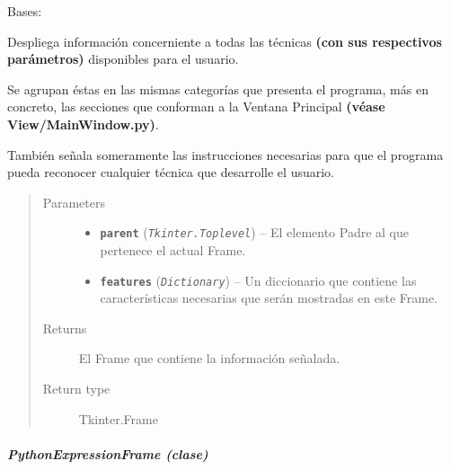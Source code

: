 \documentclass[letterpaper,10pt,english]{sphinxmanual}
\begin{document}
\begin{fulllineitems}
\label{View/Additional/MenuInternalOption/InternalOptionTab/CharacteristicFrame:View.Additional.MenuInternalOption.InternalOptionTab.CharacteristicFrame.CharacteristicFrame}
Bases: 

\begin{DUlineblock}{0em}
\item[] Despliega información concerniente a todas las técnicas 
\textbf{(con sus respectivos parámetros)} disponibles para el usuario.
\item[] Se agrupan éstas en las mismas categorías que presenta el programa,
más en concreto, las secciones que conforman a la Ventana Principal 
\textbf{(véase View/MainWindow.py)}.
\item[] 
\item[] También señala someramente las instrucciones necesarias para que el
programa pueda reconocer cualquier técnica que desarrolle el usuario.
\end{DUlineblock}
\begin{quote}\begin{description}
\item[{Parameters}] \leavevmode\begin{itemize}
\item {} 
\textbf{\texttt{parent}} (\emph{\texttt{Tkinter.Toplevel}}) -- El elemento Padre al que pertenece el actual
Frame.

\item {} 
\textbf{\texttt{features}} (\emph{\texttt{Dictionary}}) -- Un diccionario que contiene las características necesarias
que serán mostradas en este Frame.

\end{itemize}

\item[{Returns}] \leavevmode
El Frame que contiene la información señalada.

\item[{Return type}] \leavevmode
Tkinter.Frame

\end{description}\end{quote}

\end{fulllineitems}



\subparagraph{PythonExpressionFrame (clase)}
\label{View/Additional/MenuInternalOption/InternalOptionTab/PythonExpressionFrame::doc}\label{View/Additional/MenuInternalOption/InternalOptionTab/PythonExpressionFrame:module-View.Additional.MenuInternalOption.InternalOptionTab.PythonExpressionFrame}\label{View/Additional/MenuInternalOption/InternalOptionTab/PythonExpressionFrame:pythonexpressionframe-clase}
\end{document}
